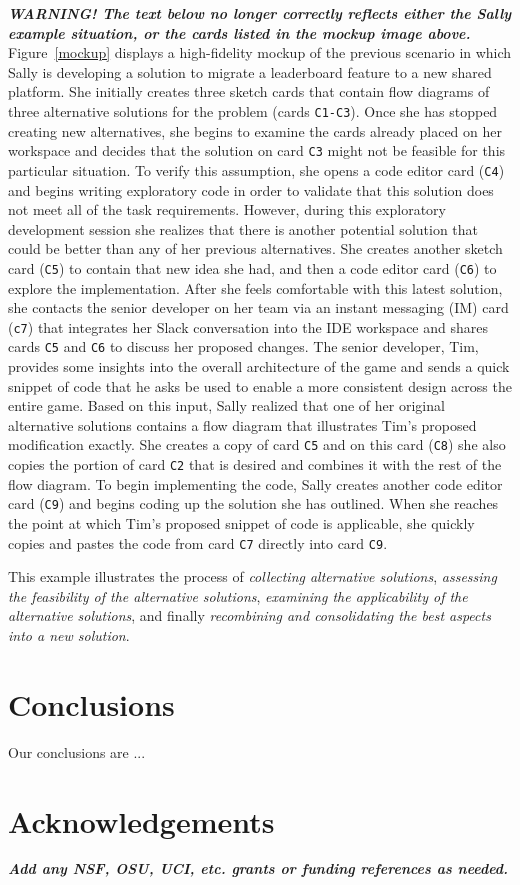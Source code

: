\documentclass{ppig}
\newcommand{\bold}[1]{\textit{\textbf{\color{aoblue}#1}}}
\begin{document}
\bold{WARNING! The text below no longer correctly reflects either the Sally example situation, or the cards listed in the mockup image above.}\\
Figure~\ref{mockup} displays a high-fidelity mockup of the previous scenario in which Sally is developing a solution to migrate a leaderboard feature to a new shared platform.
She initially creates three sketch cards that contain flow diagrams of three alternative solutions for the problem (cards \texttt{C1-C3}).
Once she has stopped creating new alternatives, she begins to examine the cards already placed on her workspace and decides that the solution on card \texttt{C3} might not be feasible for this particular situation.
To verify this assumption, she opens a code editor card (\texttt{C4}) and begins writing exploratory code in order to validate that this solution does not meet all of the task requirements.
However, during this exploratory development session she realizes that there is another potential solution that could be better than any of her previous alternatives.
She creates another sketch card (\texttt{C5}) to contain that new idea she had, and then a code editor card (\texttt{C6}) to explore the implementation.
After she feels comfortable with this latest solution, she contacts the senior developer on her team via an instant messaging (IM) card (\texttt{c7}) that integrates her Slack conversation into the IDE workspace and shares cards \texttt{C5} and \texttt{C6} to discuss her proposed changes.
The senior developer, Tim, provides some insights into the overall architecture of the game and sends a quick snippet of code that he asks be used to enable a more consistent design across the entire game.
Based on this input, Sally realized that one of her original alternative solutions contains a flow diagram that illustrates Tim's proposed modification exactly.
She creates a copy of card \texttt{C5} and on this card (\texttt{C8}) she also copies the portion of card \texttt{C2} that is desired and combines it with the rest of the flow diagram.
To begin implementing the code, Sally creates another code editor card (\texttt{C9}) and begins coding up the solution she has outlined.
When she reaches the point at which Tim's proposed snippet of code is applicable, she quickly copies and pastes the code from card \texttt{C7} directly into card \texttt{C9}.

This example illustrates the process of \textit{collecting alternative solutions}, 
\textit{assessing the feasibility of the alternative solutions}, \textit{examining the applicability of the alternative solutions}, and finally \textit{recombining and consolidating the best aspects into a new solution}.

\section{Conclusions}
Our conclusions are ...


\section{Acknowledgements}
\bold{Add any NSF, OSU, UCI, etc. grants or funding references as needed.}


 
\end{document}
